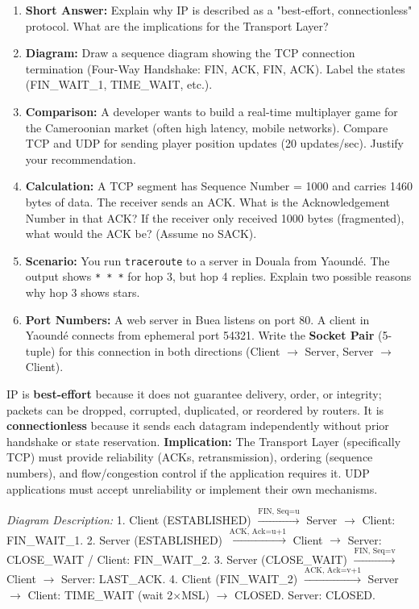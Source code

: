 \documentclass[11pt]{article}
\begin{document}
\begin{exercice}
\begin{enumerate}
    \item \textbf{Short Answer:} Explain why IP is described as a "best-effort, connectionless" protocol. What are the implications for the Transport Layer?
    \item \textbf{Diagram:} Draw a sequence diagram showing the TCP connection termination (Four-Way Handshake: FIN, ACK, FIN, ACK). Label the states (FIN\_WAIT\_1, TIME\_WAIT, etc.).
    \item \textbf{Comparison:} A developer wants to build a real-time multiplayer game for the Cameroonian market (often high latency, mobile networks). Compare TCP and UDP for sending player position updates (20 updates/sec). Justify your recommendation.
    \item \textbf{Calculation:} A TCP segment has Sequence Number = 1000 and carries 1460 bytes of data. The receiver sends an ACK. What is the Acknowledgement Number in that ACK? If the receiver only received 1000 bytes (fragmented), what would the ACK be? (Assume no SACK).
    \item \textbf{Scenario:} You run \texttt{traceroute} to a server in Douala from Yaoundé. The output shows \texttt{* * *} for hop 3, but hop 4 replies. Explain two possible reasons why hop 3 shows stars.
    \item \textbf{Port Numbers:} A web server in Buea listens on port 80. A client in Yaoundé connects from ephemeral port 54321. Write the \textbf{Socket Pair} (5-tuple) for this connection in both directions (Client $\to$ Server, Server $\to$ Client).
\end{enumerate}
\end{exercice}

\begin{corrige}[Exercise 1]
IP is \textbf{best-effort} because it does not guarantee delivery, order, or integrity; packets can be dropped, corrupted, duplicated, or reordered by routers. It is \textbf{connectionless} because it sends each datagram independently without prior handshake or state reservation. \textbf{Implication:} The Transport Layer (specifically TCP) must provide reliability (ACKs, retransmission), ordering (sequence numbers), and flow/congestion control if the application requires it. UDP applications must accept unreliability or implement their own mechanisms.
\end{corrige}

\begin{corrige}[Exercise 2]
\textit{Diagram Description:}
1. Client (ESTABLISHED) $\xrightarrow{\text{FIN, Seq=u}}$ Server $\to$ Client: FIN\_WAIT\_1.
2. Server (ESTABLISHED) $\xrightarrow{\text{ACK, Ack=u+1}}$ Client $\to$ Server: CLOSE\_WAIT / Client: FIN\_WAIT\_2.
3. Server (CLOSE\_WAIT) $\xrightarrow{\text{FIN, Seq=v}}$ Client $\to$ Server: LAST\_ACK.
4. Client (FIN\_WAIT\_2) $\xrightarrow{\text{ACK, Ack=v+1}}$ Server $\to$ Client: TIME\_WAIT (wait 2$\times$MSL) $\to$ CLOSED. Server: CLOSED.
\end{corrige}
\end{document}

